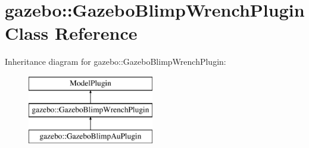 \hypertarget{classgazebo_1_1_gazebo_blimp_wrench_plugin}{\section{gazebo\-:\-:Gazebo\-Blimp\-Wrench\-Plugin Class Reference}
\label{classgazebo_1_1_gazebo_blimp_wrench_plugin}
}
Inheritance diagram for gazebo\-:\-:Gazebo\-Blimp\-Wrench\-Plugin\-:\begin{figure}[H]
\begin{center}
\leavevmode
\includegraphics[height=3.000000cm]{classgazebo_1_1_gazebo_blimp_wrench_plugin}
\end{center}
\end{figure}
